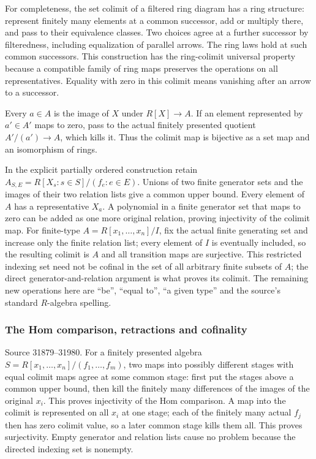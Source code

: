 For completeness, the set colimit of a filtered ring diagram has a ring structure: represent finitely many elements at a common successor, add or multiply there, and pass to their equivalence classes. Two choices agree at a further successor by filteredness, including equalization of parallel arrows. The ring laws hold at such common successors. This construction has the ring-colimit universal property because a compatible family of ring maps preserves the operations on all representatives. Equality with zero in this colimit means vanishing after an arrow to a successor.

Every \(a\in A\) is the image of \(X\) under \(R[X]\to A\). If an element represented by \(a'\in A'\) maps to zero, pass to the actual finitely presented quotient \(A'/(a')\to A\), which kills it. Thus the colimit map is bijective as a set map and an isomorphism of rings.

In the explicit partially ordered construction retain \(A_{S,E}=R[X_s:s\in S]/(f_e:e\in E)\). Unions of two finite generator sets and the images of their two relation lists give a common upper bound. Every element of \(A\) has a representative \(X_a\). A polynomial in a finite generator set that maps to zero can be added as one more original relation, proving injectivity of the colimit map. For finite-type \(A=R[x_1,\ldots,x_n]/I\), fix the actual finite generating set and increase only the finite relation list; every element of \(I\) is eventually included, so the resulting colimit is \(A\) and all transition maps are surjective. This restricted indexing set need not be cofinal in the set of all arbitrary finite subsets of \(A\); the direct generator-and-relation argument is what proves its colimit. The remaining new operations here are ``be'', ``equal to'', ``a given type'' and the source's standard \(R\)-algebra spelling.

\subsubsection{The Hom comparison, retractions and cofinality}\label{the-hom-comparison-retractions-and-cofinality}

Source 31879--31980. For a finitely presented algebra \(S=R[x_1,\ldots,x_n]/(f_1,\ldots,f_m)\), two maps into possibly different stages with equal colimit maps agree at some common stage: first put the stages above a common upper bound, then kill the finitely many differences of the images of the original \(x_i\). This proves injectivity of the Hom comparison. A map into the colimit is represented on all \(x_i\) at one stage; each of the finitely many actual \(f_j\) then has zero colimit value, so a later common stage kills them all. This proves surjectivity. Empty generator and relation lists cause no problem because the directed indexing set is nonempty.

